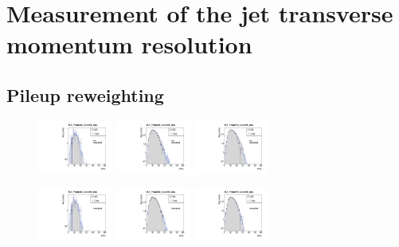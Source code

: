 \chapter{Measurement of the jet transverse momentum resolution}
\section{Pileup reweighting}
\label{res:app:pileup}

\begin{figure}[ht]
 \centering
    \includegraphics[width=0.22\textwidth]{figures/resolution/eventSelection/NVtxComparisonWoWeights1.pdf}
    \includegraphics[width=0.22\textwidth]{figures/resolution/eventSelection/NVtxComparisonWoWeights2.pdf}
    \includegraphics[width=0.22\textwidth]{figures/resolution/eventSelection/NVtxComparisonWoWeights3.pdf}

    \includegraphics[width=0.22\textwidth]{figures/resolution/eventSelection/NVtxComparison1.pdf}
    \includegraphics[width=0.22\textwidth]{figures/resolution/eventSelection/NVtxComparison2.pdf}
    \includegraphics[width=0.22\textwidth]{figures/resolution/eventSelection/NVtxComparison3.pdf}


\end{figure}
